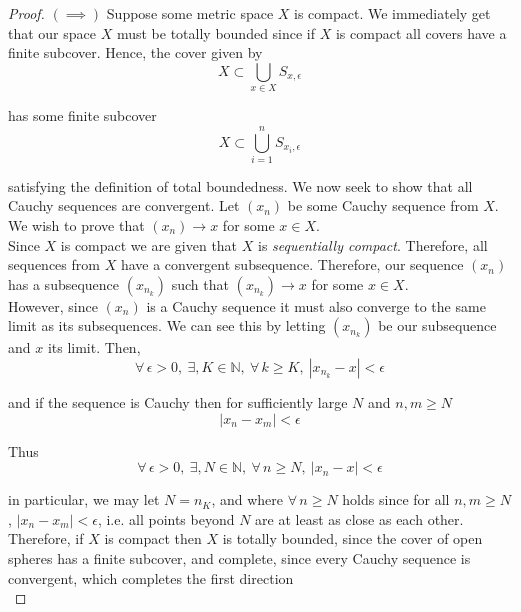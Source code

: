 \documentclass[12pt]{article}
\newlength\tindent
\renewcommand{\indent}{\hspace*{\tindent}}
\newcommand{\N}{\mathbb N}
\begin{document}
\begin{proof} $(\implies)$ Suppose some metric space $X$ is compact. We immediately get that our space $X$ must be totally bounded since if $X$ is compact all covers have a finite subcover. Hence, the cover given by
\begin{equation*}
	X \subset \bigcup_{x\in X} S_{x,\epsilon}
\end{equation*}

has some finite subcover
\begin{equation*}
	X \subset \bigcup^n_{i = 1} S_{x_i,\epsilon}
\end{equation*}

satisfying the definition of total boundedness. We now seek to show that all Cauchy sequences are convergent. Let $(x_n)$ be some Cauchy sequence from $X$. We wish to prove that $(x_n) \to x$ for some $x \in X$. \\

Since $X$ is compact we are given that $X$ is {\em sequentially compact}. Therefore, all sequences from $X$ have a convergent subsequence. Therefore, our sequence $(x_n)$ has a subsequence $(x_{n_k})$ such that $(x_{n_k})\to x$ for some $x \in X$. \\

\indent However, since $(x_n)$ is a Cauchy sequence it must also converge to the same limit as its subsequences. We can see this by letting $(x_{n_k})$ be our subsequence and $x$ its limit. Then, 
\begin{equation*}
	\forall\,\epsilon > 0,~\exists,K\in\N,~\forall\,k\geq K,~ \left| x_{n_k} - x \right| < \epsilon
\end{equation*}

and if the sequence is Cauchy then for sufficiently large $N$ and $n,m \geq N$
\begin{equation*}
	|x_n - x_m| < \epsilon
\end{equation*}

Thus
\begin{equation*}
	\forall\,\epsilon > 0,~\exists,N\in\N,~\forall\,n\geq N,~ \left| x_{n} - x \right| < \epsilon
\end{equation*}

in particular, we may let $N = n_K$, and where $\forall\,n\geq N$ holds since for all $n, m \geq N$, $|x_n - x_m| < \epsilon$, i.e. all points beyond $N$ are at least as close as each other. \\

\indent Therefore, if $X$ is compact then $X$ is totally bounded, since the cover of open spheres has a finite subcover, and complete, since every Cauchy sequence is convergent, which completes the first direction \\



\end{proof}
\end{document}

